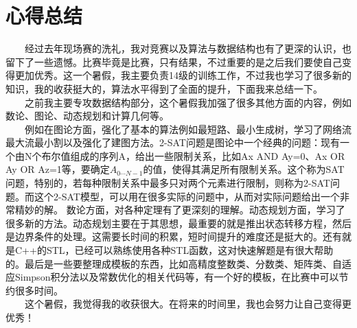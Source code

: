 \section{心得总结}
　　经过去年现场赛的洗礼，我对竞赛以及算法与数据结构也有了更深的认识，也留下了一些遗憾。比赛毕竟是比赛，只有结果，不过重要的是之后我们要使自己变得更加优秀。这一个暑假，我主要负责14级的训练工作，不过我也学习了很多新的知识，我的收获挺大的，算法水平得到了全面的提升，下面我来总结一下。\\
　　之前我主要专攻数据结构部分，这个暑假我加强了很多其他方面的内容，例如数论、图论、动态规划和计算几何等。\\
　　例如在图论方面，强化了基本的算法例如最短路、最小生成树，学习了网络流最大流最小割以及强化了建图方法。2-SAT问题是图论中一个经典的问题：现有一个由N个布尔值组成的序列A，给出一些限制关系，比如Ax AND Ay=0、Ax OR Ay OR Az=1等，要确定$A_{0\cdots N-1}$的值，使得其满足所有限制关系。这个称为SAT问题，特别的，若每种限制关系中最多只对两个元素进行限制，则称为2-SAT问题。而这个2-SAT模型，可以用在很多实际的问题中，从而对实际问题给出一个非常精妙的解。
	数论方面，对各种定理有了更深刻的理解。动态规划方面，学习了很多新的方法。动态规划主要在于其思想，最重要的就是推出状态转移方程，然后是边界条件的处理。这需要长时间的积累，短时间提升的难度还是挺大的。还有就是C++的STL，已经可以熟练使用各种STL函数，这对快速解题是有很大帮助的。最后是一些要整理成模板的东西，比如高精度整数类、分数类、矩阵类、自适应Simpson积分法以及常数优化的相关代码等，有一个好的模板，在比赛中可以节约很多时间。\\
　　这个暑假，我觉得我的收获很大。在将来的时间里，我也会努力让自己变得更优秀！\\
